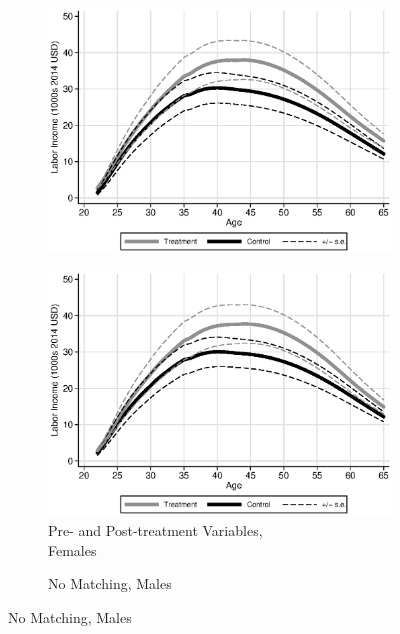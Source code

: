 \begin{figure}
\begin{subfigure}[h]{0.25\textwidth}
		\includegraphics[width=\textwidth]{output/labor_20-65_pset1_mset2_female_sensitivity.eps}
\end{subfigure}%
\begin{subfigure}[h]{0.25\textwidth}
	\centering
	\caption{Pre- and Post-treatment Variables,\\ Females}
		\includegraphics[width=\textwidth]{output/labor_20-65_pset1_mset3_female_sensitivity.eps}
\end{subfigure}
\begin{subfigure}[h]{0.25\textwidth}
		\centering
		\caption{No Matching, Males}

\end{subfigure}
\end{figure}
